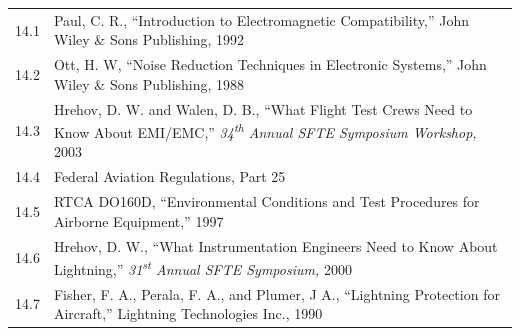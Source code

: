 \documentclass[
]{book}
\begin{document}
\begin{longtable}[]{@{}ll@{}}
\toprule
\endhead
\begin{minipage}[t]{0.06\columnwidth}\raggedright
14.1\strut
\end{minipage} & \begin{minipage}[t]{0.88\columnwidth}\raggedright
Paul, C. R., ``Introduction to Electromagnetic Compatibility,'' John Wiley \& Sons Publishing, 1992\strut
\end{minipage}\tabularnewline
\begin{minipage}[t]{0.06\columnwidth}\raggedright
14.2\strut
\end{minipage} & \begin{minipage}[t]{0.88\columnwidth}\raggedright
Ott, H. W, ``Noise Reduction Techniques in Electronic Systems,'' John Wiley \& Sons Publishing, 1988\strut
\end{minipage}\tabularnewline
\begin{minipage}[t]{0.06\columnwidth}\raggedright
14.3\strut
\end{minipage} & \begin{minipage}[t]{0.88\columnwidth}\raggedright
Hrehov, D. W. and Walen, D. B., ``What Flight Test Crews Need to Know About EMI/EMC,'' \emph{34\textsuperscript{th} Annual SFTE Symposium Workshop,} 2003\strut
\end{minipage}\tabularnewline
\begin{minipage}[t]{0.06\columnwidth}\raggedright
14.4\strut
\end{minipage} & \begin{minipage}[t]{0.88\columnwidth}\raggedright
Federal Aviation Regulations, Part 25\strut
\end{minipage}\tabularnewline
\begin{minipage}[t]{0.06\columnwidth}\raggedright
14.5\strut
\end{minipage} & \begin{minipage}[t]{0.88\columnwidth}\raggedright
RTCA DO160D, ``Environmental Conditions and Test Procedures for Airborne Equipment,'' 1997\strut
\end{minipage}\tabularnewline
\begin{minipage}[t]{0.06\columnwidth}\raggedright
14.6\strut
\end{minipage} & \begin{minipage}[t]{0.88\columnwidth}\raggedright
Hrehov, D. W., ``What Instrumentation Engineers Need to Know About Lightning,'' \emph{31\textsuperscript{st} Annual SFTE Symposium,} 2000\strut
\end{minipage}\tabularnewline
\begin{minipage}[t]{0.06\columnwidth}\raggedright
14.7\strut
\end{minipage} & \begin{minipage}[t]{0.88\columnwidth}\raggedright
Fisher, F. A., Perala, F. A., and Plumer, J A., ``Lightning Protection for Aircraft,'' Lightning Technologies Inc., 1990\strut
\end{minipage}\tabularnewline
\bottomrule
\end{longtable}
\end{document}
